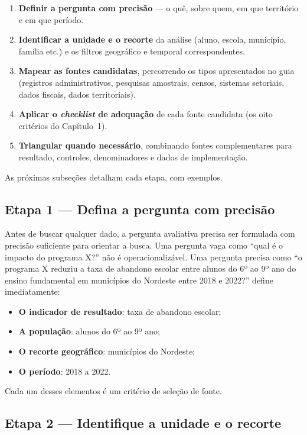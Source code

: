 \begin{enumerate}
  \item \textbf{Definir a pergunta com precisão} --- o quê, sobre quem, em que território e em que período.
  \item \textbf{Identificar a unidade e o recorte} da análise (aluno, escola, município, família etc.) e os filtros geográfico e temporal correspondentes.
  \item \textbf{Mapear as fontes candidatas}, percorrendo os tipos apresentados no guia (registros administrativos, pesquisas amostrais, censos, sistemas setoriais, dados fiscais, dados territoriais).
  \item \textbf{Aplicar o \textit{checklist} de adequação} de cada fonte candidata (os oito critérios do Capítulo~1).
  \item \textbf{Triangular quando necessário}, combinando fontes complementares para resultado, controles, denominadores e dados de implementação.
\end{enumerate}

As próximas subseções detalham cada etapa, com exemplos.

\subsection{Etapa 1 --- Defina a pergunta com precisão}

Antes de buscar qualquer dado, a pergunta avaliativa precisa ser formulada com precisão suficiente para orientar a busca. Uma pergunta vaga como ``qual é o impacto do programa X?'' não é operacionalizável. Uma pergunta precisa como ``o programa X reduziu a taxa de abandono escolar entre alunos do 6º ao 9º ano do ensino fundamental em municípios do Nordeste entre 2018 e 2022?'' define imediatamente:

\begin{itemize}
  \item \textbf{O indicador de resultado}: taxa de abandono escolar;
  \item \textbf{A população}: alunos do 6º ao 9º ano;
  \item \textbf{O recorte geográfico}: municípios do Nordeste;
  \item \textbf{O período}: 2018 a 2022.
\end{itemize}

Cada um desses elementos é um critério de seleção de fonte.

\subsection{Etapa 2 --- Identifique a unidade e o recorte}

